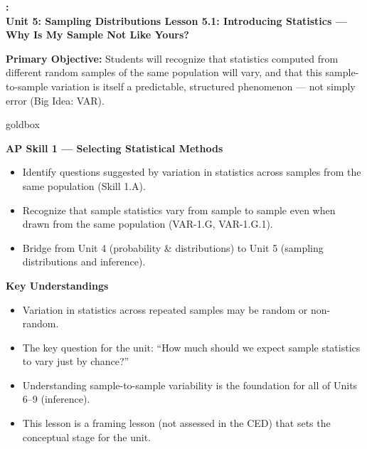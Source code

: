 \documentclass[10pt]{article}
\newcommand{\UnitNumberName}{Unit 5: Sampling Distributions \quad}
\newcommand{\LessonNumberName}{Lesson 5.1: Introducing Statistics --- Why Is My Sample Not Like Yours?}
\begin{document}
\begin{center}
    {\Large\bfseries \CourseName: \SchoolYear \\
    {\small\bfseries \UnitNumberName \LessonNumberName}}
\end{center}

\begin{tcolorbox}[colback=sky, colframe=navy, boxrule=0.9pt, arc=2mm,
    left=2mm, right=2mm, top=1.5mm, bottom=1.5mm]
    \textbf{Primary Objective:} Students will recognize that statistics computed from
    different random samples of the same population will vary, and that this sample-to-sample
    variation is itself a predictable, structured phenomenon --- not simply error
    (Big Idea: VAR).
\end{tcolorbox}

\renewcommand{\arraystretch}{1.6}
\begin{skillbox}{goldbox}
\begin{minipage}[t]{0.48\linewidth}
    \textbf{AP Skill 1 --- Selecting Statistical Methods}
    \begin{itemize}
        \item Identify questions suggested by variation in statistics across samples
              from the same population (Skill 1.A).
        \item Recognize that sample statistics vary from sample to sample even when
              drawn from the same population (VAR-1.G, VAR-1.G.1).
        \item Bridge from Unit 4 (probability \& distributions) to Unit 5
              (sampling distributions and inference).
    \end{itemize}
\end{minipage}
\hfill
\begin{minipage}[t]{0.48\linewidth}
    \textbf{Key Understandings}
    \begin{itemize}
        \item Variation in statistics across repeated samples may be random or
              non-random.
        \item The key question for the unit: ``How much should we expect sample
              statistics to vary just by chance?''
        \item Understanding sample-to-sample variability is the foundation for all
              of Units 6--9 (inference).
        \item This lesson is a framing lesson (not assessed in the CED) that sets
              the conceptual stage for the unit.
    \end{itemize}
\end{minipage}
\end{skillbox}
\end{document}
